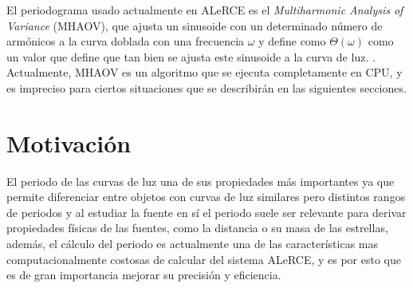 El periodograma usado actualmente en ALeRCE es el {\it Multiharmonic Analysis of Variance} (MHAOV), que ajusta un sinusoide con un determinado número de armónicos a la curva doblada con una frecuencia $\omega$ y define como $\Theta(\omega)$ como un valor que define que tan bien se ajusta este sinusoide a la curva de luz. \cite{MHAOV}. Actualmente, MHAOV es un algoritmo que se ejecuta completamente en CPU, y es impreciso para ciertos situaciones que se describirán en las siguientes secciones.

\section{Motivación}\label{sec:motivacion}
El periodo de las curvas de luz una de sus propiedades más importantes ya que permite diferenciar entre objetos con curvas de luz similares pero distintos rangos de periodos y al estudiar la fuente en sí el periodo suele ser relevante para derivar propiedades físicas de las fuentes, como la distancia o su masa de las estrellas, además, el cálculo del periodo es actualmente una de las características mas computacionalmente costosas de calcular del sistema ALeRCE, y es por esto que es de gran importancia mejorar su precisión y eficiencia.

